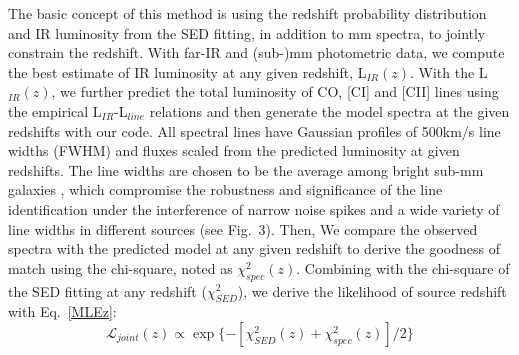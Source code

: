 \documentclass{webofc}
\begin{document}
The basic concept of this method is using the redshift probability distribution and IR luminosity from the SED fitting, in addition to mm spectra, to jointly constrain the redshift. With far-IR and (sub-)mm photometric data, we compute the best estimate of IR luminosity at any given redshift, L$_{IR}(z)$. With the L$_{IR}(z)$, we further predict the total luminosity of CO, [CI] and [CII] lines using the empirical L$_{IR}$-L$_{line}$ relations \cite{Liu15} and then generate the model spectra at the given redshifts with our code. All spectral lines have Gaussian profiles of 500km/s line widths (FWHM) and fluxes scaled from the predicted luminosity at given redshifts. The line widths are chosen to be the average among bright sub-mm galaxies \cite{Spilker14}, which compromise the robustness and significance of the line identification under the interference of narrow noise spikes and a wide variety of line widths in different sources (see Fig.~3). Then, We compare the observed spectra with the predicted model at any given redshift to derive the goodness of match using the chi-square, noted as $\chi_{spec}^2(z)$. Combining with the chi-square of the SED fitting at any redshift ($\chi_{SED}^2$), we derive the likelihood of source redshift with Eq.~\ref{MLEz}:
\begin{equation}
\label{MLEz}
\mathcal{L}_{joint}(z) \propto \exp\{-[\chi_{SED}^2(z)+\chi_{spec}^2(z)]/2\}
\end{equation}


\end{document}
